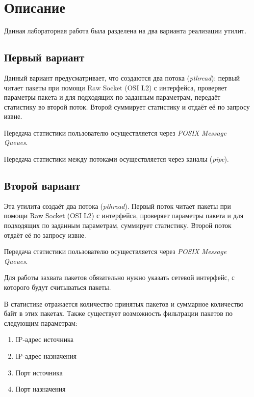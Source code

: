 \section{Описание}

Данная лабораторная работа была разделена на два варианта реализации утилит.

\subsection{Первый вариант}

Данный вариант предусматривает, что создаются два потока (\textit{pthread}): первый читает пакеты при помощи Raw Socket (OSI L2) с интерфейса, проверяет параметры пакета и для подходящих по заданным параметрам, передаёт статистику во второй поток. Второй суммирует статистику и отдаёт её по запросу извне.

Передача статистики пользователю осуществляется через \textit{POSIX Message Queues}.

Передача статистики между потоками осуществляется через каналы (\textit{pipe}).

\subsection{Второй вариант}

Эта утилита создаёт два потока (\textit{pthread}). Первый поток читает пакеты при помощи Raw Socket (OSI L2) с интерфейса, проверяет параметры пакета и для подходящих по заданным параметрам, суммирует статистику. Второй поток отдаёт её по запросу извне.

Передача статистики пользователю осуществляется через \textit{POSIX Message Queues}.

\newpage

Для работы захвата пакетов обязательно нужно указать сетевой интерфейс, с которого будут считываться пакеты.

В статистике отражается количество принятых пакетов и суммарное количество байт в этих пакетах. Также существует возможность фильтрации пакетов по следующим параметрам:
\begin{enumerate}
    \item IP-адрес источника
    \item IP-адрес назначения
    \item Порт источника
    \item Порт назначения
\end{enumerate}

